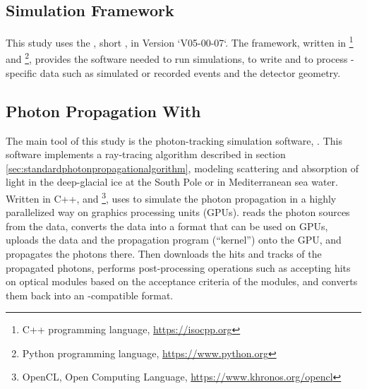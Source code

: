 
\label{sec:tools}

\subsection{\icecube Simulation Framework}

This study uses the , short \icesim, in Version `V05-00-07`.
The framework, written in \footnote{C++ programming language, \url{https://isocpp.org}} and \footnote{Python programming language, \url{https://www.python.org}}, provides the software needed to run simulations, to write and to process \icecube-specific data such as simulated or recorded events and the detector geometry.



\subsection{Photon Propagation With \clsim}

The main tool of this study is the photon-tracking simulation software, \clsim. This software implements a ray-tracing algorithm described in section \ref{sec:standardphotonpropagationalgorithm}, modeling scattering and absorption of light in the deep-glacial ice at the South Pole or in Mediterranean sea water. \cite{clsimreadme}
Written in C++,  and \footnote{OpenCL, Open Computing Language, \url{https://www.khronos.org/opencl}}, \clsim uses  to simulate the photon propagation in a highly parallelized way on graphics processing units (GPUs). \cite{clsimsource}
\clsim reads the photon sources from the \icesim data, converts the data into a format that can be used on GPUs, uploads the data and the propagation program (``kernel'') onto the GPU, and propagates the photons there. Then \clsim downloads the hits and tracks of the propagated photons, performs post-processing operations such as accepting hits on optical modules based on the acceptance criteria of the modules, and converts them back into an \icesim-compatible format.

